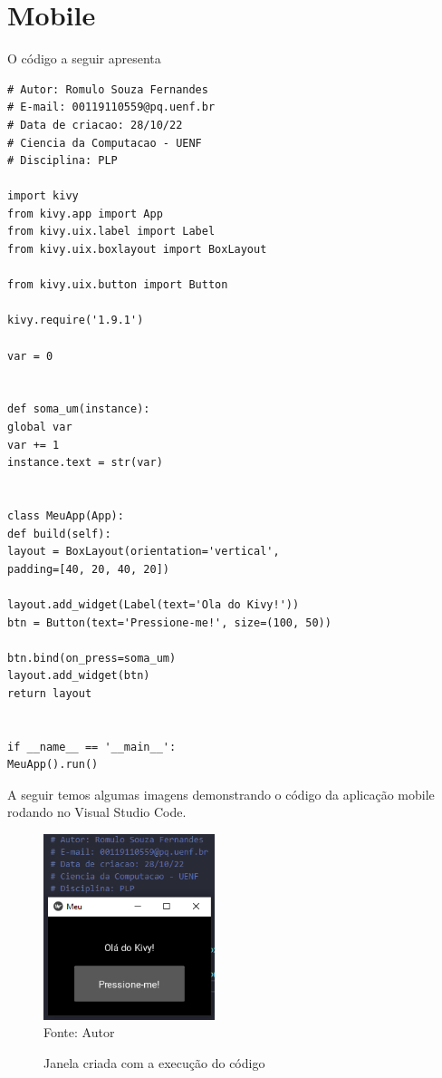     \section{Mobile}
    O código a seguir apresenta
    \begin{lstlisting}
# Autor: Romulo Souza Fernandes
# E-mail: 00119110559@pq.uenf.br
# Data de criacao: 28/10/22
# Ciencia da Computacao - UENF
# Disciplina: PLP

import kivy
from kivy.app import App
from kivy.uix.label import Label
from kivy.uix.boxlayout import BoxLayout

from kivy.uix.button import Button

kivy.require('1.9.1')

var = 0


def soma_um(instance):
global var
var += 1
instance.text = str(var)


class MeuApp(App):
def build(self):
layout = BoxLayout(orientation='vertical',
padding=[40, 20, 40, 20])

layout.add_widget(Label(text='Ola do Kivy!'))
btn = Button(text='Pressione-me!', size=(100, 50))

btn.bind(on_press=soma_um)
layout.add_widget(btn)
return layout


if __name__ == '__main__':
MeuApp().run()
    \end{lstlisting}
	A seguir temos algumas imagens demonstrando o código da aplicação mobile rodando no Visual Studio Code.
		\begin{figure}[H]
		\begin{center}
			\caption{Janela criada com a execução do código} \label{ling1}
			\includegraphics[width=5cm]{mobile.PNG} \\
			{\tiny \sf Fonte:{ Autor}}
		\end{center}
	\end{figure}

